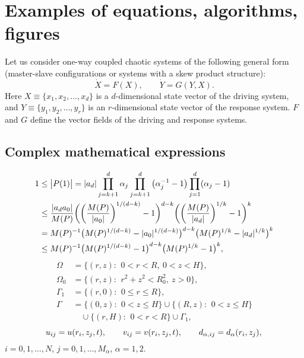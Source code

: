 \documentclass[a4paper, 10pt]{article}
\begin{document}
\section{Examples of equations, algorithms, figures}\label{s:2}
Let us consider one-way coupled chaotic systems of the following general form (master-slave configurations or systems with a skew product structure):
%
\begin{equation}\label{eq:1}
   \dot{X}=F(X),\qquad \dot{Y}=G(Y,X).
\end{equation}
%
Here $X\equiv\{x_1,x_2,\ldots,x_d\}$ is a $d$-dimensional state vector of the driving system, and $Y\equiv\{y_1,y_2,\ldots,y_r\}$ is an $r$-dimensional state vector of the response system. $F$ and $G$ define the vector fields of the driving and response systems.

\subsection{Complex mathematical expressions}\label{s:2.1}
%
\begin{align}
 1
&\le\big|P(1)\big|=|a_d|\prod_{j=k+1}^d\alpha_j\prod_{j=k+1}^d\big(\alpha_j^{-1}-1\big)\prod_{j=1}^d(\alpha_j-1)\notag\\
&\le\frac{|a_da_0|}{M(P)}\bigg(\bigg(\frac{M(P)}{|a_0|}\bigg)^{1/(d-k)}-1\bigg)^{d-k}\bigg(\bigg(\frac{M(P)}{|a_d|}\bigg)^{1/k}-1\bigg)^k\notag\\
&= M(P)^{-1}\big(M(P)^{1/(d-k)}-|a_0|^{1/(d-k)}\big)^{d-k}\big(M(P)^{1/k}-|a_d|^{1/k}\big)^k\notag\\
&\le M(P)^{-1}\big(M(P)^{1/(d-k)}-1\big)^{d-k}\big(M(P)^{1/k}-1\big)^k,\label{eq:2}
\end{align}
%
\begin{equation}\label{eq:3}
\begin{split}
 \varOmega
&=\big\{(r,z){:}\ \,0<r<R,\ 0<z<H\big\},\\
 \varOmega_0
&=\big\{(r,z){:}\ \,r^2+z^2<R_0^2,\ z>0\big\},\\
 \varGamma_1
&=\big\{(r,0){:}\ \,0\le r\le R\big\},\\
 \varGamma
&=\big\{(0,z){:}\ \,0<z\le H\big\}\cup\big\{(R,z){:}\ \,0<z\le H\big\}\\
&\quad\cup\big\{(r,H){:}\ \,0<r<R\big\}\cup\varGamma_1,
\end{split}
\end{equation}
%
\begin{equation*}
u_{ij}=u(r_i,z_j,t),\qquad v_{ij}=v(r_i,z_j,t),\qquad d_{\alpha,ij}=d_{\alpha}(r_i,z_j), \\
\end{equation*}
%
$i=0,1,\ldots,N$, $j=0,1,\ldots,M_\alpha$, $\alpha=1,2$.
\end{document}
